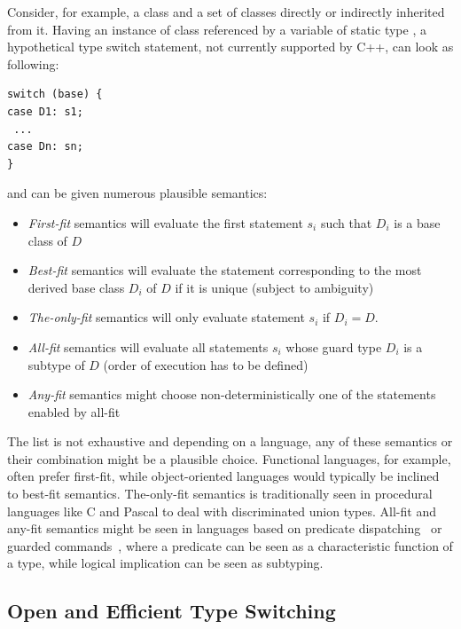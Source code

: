 Consider, for example, a class  and a set of classes  directly 
or indirectly inherited from it. Having an instance of class  referenced 
by a variable  of static type , a hypothetical type switch 
statement, not currently supported by C++, can look as following:

\begin{lstlisting}
switch (base) {
case D1: s1;
 ...
case Dn: sn;
}
\end{lstlisting}

\noindent and can be given numerous plausible semantics:

\begin{itemize}
\setlength{\itemsep}{0pt}
\setlength{\parskip}{0pt}
\item \emph{First-fit} semantics will evaluate the first statement $s_i$ such 
      that $D_i$ is a base class of $D$
\item \emph{Best-fit} semantics will evaluate the statement corresponding to the 
      most derived base class $D_i$ of $D$ if it is unique (subject to 
      ambiguity)
\item \emph{The-only-fit} semantics will only evaluate statement $s_i$ if $D_i=D$.
\item \emph{All-fit} semantics will evaluate all statements $s_i$ whose guard 
      type $D_i$ is a subtype of $D$ (order of execution has to be defined)
\item \emph{Any-fit} semantics might choose non-deterministically one of the 
      statements enabled by all-fit
\end{itemize}

\noindent
The list is not exhaustive and depending on a language, any of these semantics 
or their combination might be a plausible choice. Functional languages, for 
example, often prefer first-fit, while object-oriented languages would typically 
be inclined to best-fit semantics. The-only-fit semantics is traditionally seen 
in procedural languages like C and Pascal to deal with discriminated union types. 
All-fit and any-fit semantics might be seen in languages based on predicate 
dispatching~\cite{ErnstKC98} or guarded commands~\cite{EWD:EWD472}, where a 
predicate can be seen as a characteristic function of a type, while logical 
implication can be seen as subtyping.

\subsection{Open and Efficient Type Switching}
\label{sec:poets}

